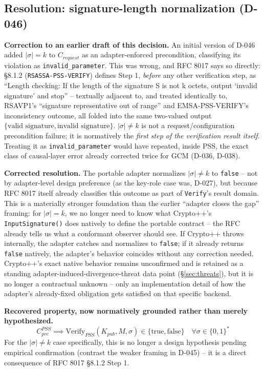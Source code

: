 \documentclass[11pt,a4paper]{article}
\begin{document}
\subsection{Resolution: signature-length normalization (D-046)}\label{sec:pss-siglen}
\textbf{Correction to an earlier draft of this decision.} An initial version of D-046 added $|\sigma|=k$ to $C_{request}$ as an adapter-enforced precondition, classifying its violation as \texttt{invalid\_parameter}. This was wrong, and RFC 8017 says so directly: \S8.1.2 (\texttt{RSASSA-PSS-VERIFY}) defines Step 1, \emph{before} any other verification step, as ``Length checking: If the length of the signature S is not k octets, output `invalid signature' and stop'' -- textually adjacent to, and treated identically to, RSAVP1's ``signature representative out of range'' and EMSA-PSS-VERIFY's inconsistency outcome, all folded into the same two-valued output $\{\text{valid signature}, \text{invalid signature}\}$. $|\sigma| \neq k$ is not a request/configuration precondition failure; it is normatively the \emph{first step of the verification result itself}. Treating it as \texttt{invalid\_parameter} would have repeated, inside PSS, the exact class of causal-layer error already corrected twice for GCM (D-036, D-038).

\textbf{Corrected resolution.} The portable adapter normalizes $|\sigma| \neq k$ to \texttt{false} -- not by adapter-level design preference (as the key-role case was, D-027), but because RFC 8017 itself already classifies this outcome as part of \texttt{Verify}'s result domain. This is a materially stronger foundation than the earlier ``adapter closes the gap'' framing: for $|\sigma|=k$, we no longer need to know what Crypto++'s \texttt{InputSignature()} does natively to define the portable contract -- the RFC already tells us what a conformant observer should see. If Crypto++ throws internally, the adapter catches and normalizes to \texttt{false}; if it already returns \texttt{false} natively, the adapter's behavior coincides without any correction needed. Crypto++'s exact native behavior remains unconfirmed and is retained as a standing adapter-induced-divergence-threat data point (\S\ref{sec:threats}), but it is no longer a contractual unknown -- only an implementation detail of how the adapter's already-fixed obligation gets satisfied on that specific backend.

\textbf{Recovered property, now normatively grounded rather than merely hypothesized.}
\[C_{pre}^{PSS} \implies \text{Verify}_{PSS}(K_{pub}, M, \sigma) \in \{\text{true}, \text{false}\} \quad \forall \sigma \in \{0,1\}^*\]
For the $|\sigma| \neq k$ case specifically, this is no longer a design hypothesis pending empirical confirmation (contrast the weaker framing in D-045) -- it is a direct consequence of RFC 8017 \S8.1.2 Step 1.
\end{document}
